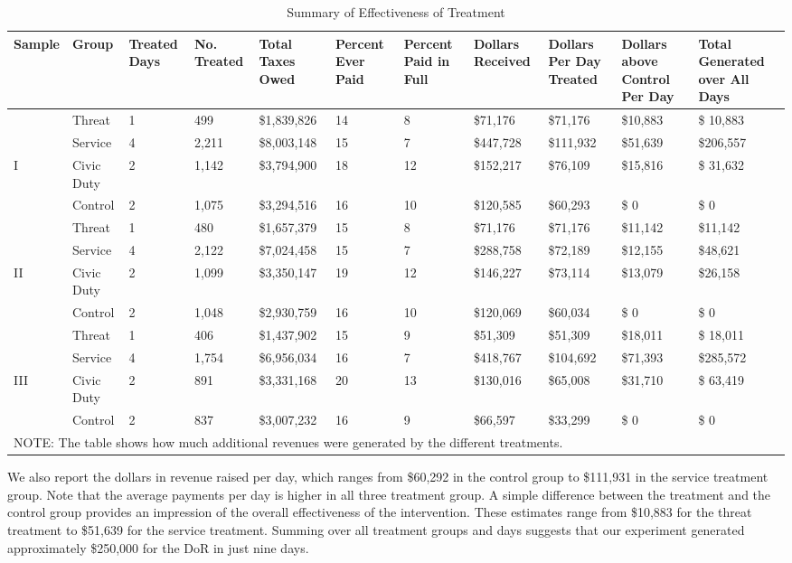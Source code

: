 \documentclass[12pt,titlepage]{article}
\begin{document}
\begin{sidewaystable}[htbp]
\caption{Summary of Effectiveness of Treatment}  \label{table:summary}
\bigskip
\centering
\begin{tabular}{|p{1.3cm}|p{1.3cm}|p{1.3cm}|p{1.3cm}|p{2cm}|p{1.4cm}|p{1.4cm}|p{1.4cm}|p{1.4cm}|p{1.4cm}|p{1.6cm}|}
  \hline
Sample & Group & Treated Days & No. Treated & Total Taxes Owed & Percent Ever Paid & Percent Paid in Full & Dollars Received & Dollars Per Day Treated & Dollars above Control Per Day & Total Generated over All Days \\ 
  \hline
 & Threat & 1 & 499 & \$1,839,826 & 14 &  8 & \$71,176 & \$71,176 & \$10,883 & \$ 10,883 \\ 
   & Service & 4 & 2,211 & \$8,003,148 & 15 &  7 & \$447,728 & \$111,932 & \$51,639 & \$206,557 \\ 
  I & Civic Duty & 2 & 1,142 & \$3,794,900 & 18 & 12 & \$152,217 & \$76,109 & \$15,816 & \$ 31,632 \\ 
  & Control & 2 & 1,075 & \$3,294,516 & 16 & 10 & \$120,585 & \$60,293 & \$     0 & \$      0 \\ 
   \hline
 & Threat & 1 & 480 & \$1,657,379 & 15 &  8 & \$71,176 & \$71,176 & \$11,142 & \$11,142 \\ 
 & Service & 4 & 2,122 & \$7,024,458 & 15 &  7 & \$288,758 & \$72,189 & \$12,155 & \$48,621 \\ 
II & Civic Duty & 2 & 1,099 & \$3,350,147 & 19 & 12 & \$146,227 & \$73,114 & \$13,079 & \$26,158 \\ 
 & Control & 2 & 1,048 & \$2,930,759 & 16 & 10 & \$120,069 & \$60,034 & \$     0 & \$     0 \\ 
   \hline
 & Threat & 1 & 406 & \$1,437,902 & 15 &  9 & \$51,309 & \$51,309 & \$18,011 & \$ 18,011 \\ 
 & Service & 4 & 1,754 & \$6,956,034 & 16 &  7 & \$418,767 & \$104,692 & \$71,393 & \$285,572 \\ 
  III & Civic Duty & 2 & 891 & \$3,331,168 & 20 & 13 & \$130,016 & \$65,008 & \$31,710 & \$ 63,419 \\ 
 & Control & 2 & 837 & \$3,007,232 & 16 &  9 & \$66,597 & \$33,299 & \$     0 & \$      0 \\ 
   \hline
\multicolumn{11}{l}{NOTE: The table shows how much additional revenues were generated by the different treatments.} \\
\end{tabular}
\end{sidewaystable}

We also report the dollars in revenue raised per day, which ranges
from \$60,292 in the control group to \$111,931 in the service
treatment group. Note that the average payments per day is higher in
all three treatment group. A simple difference between the treatment
and the control group provides an impression of the overall
effectiveness of the intervention. These estimates range from \$10,883
for the threat treatment to \$51,639 for the service
treatment. Summing over all treatment groups and days suggests that
our experiment generated approximately \$250,000 for the DoR in just
nine days.  
\end{document}
